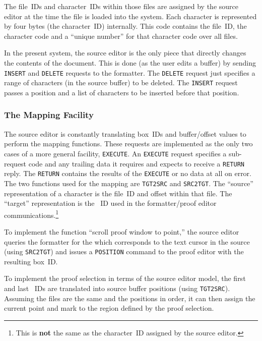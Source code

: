 The file~IDs and character~IDs within those files are assigned by the
source editor at the time the file is loaded into the system.  Each
character is represented by four bytes (the character~ID) internally.
This code contains the file~ID, the character code and a ``unique
number'' for that character code over all files.

In the present system, the source editor is the only piece that
directly changes the contents of the document.  This is done
(as the user edits a buffer) by sending {\tt INSERT} and {\tt DELETE}
requests to the formatter.  The {\tt DELETE} request just specifies
a range of characters (in the source buffer) to be deleted.  The
{\tt INSERT} request passes a position and a list of characters
to be inserted before that position.

\subsubsection{The Mapping Facility}

The source editor is constantly translating box~IDs and buffer/offset
values to perform the mapping functions.  These requests are implemented
as the only two cases of a more general facility, {\tt EXECUTE}.
An {\tt EXECUTE} request specifies a sub-request code and any trailing
data it requires and expects to receive a {\tt RETURN} reply.
The {\tt RETURN} contains the results of the {\tt EXECUTE} or no
data at all on error.  The two functions used for the mapping are
{\tt TGT2SRC} and {\tt SRC2TGT}.  The ``source'' representation of
a character is the file~ID and offset within that file.  The
``target'' representation is the \tbox~ID used in the formatter/proof
editor communications.\footnote{This is {\bf not} the same as the
character~ID assigned by the source editor.}

To implement the function ``scroll proof window to point,'' the source
editor queries the formatter for the {\tbox} which corresponds to the
text cursor in the source (using {\tt SRC2TGT}) and issues a
{\tt POSITION} command to the proof editor with the resulting box~ID.

To implement the proof selection in terms of the source editor model,
the first and last \tbox~IDs are translated into source buffer
positions (using {\tt TGT2SRC}).  Assuming the files are the same
and the positions in order, it can then assign the current point and
mark to the region defined by the proof selection.
